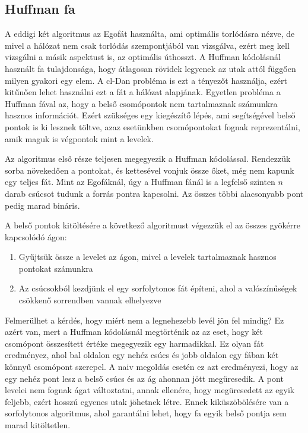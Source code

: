 \documentclass[12pt]{report}
\begin{document}
\subsection{Huffman fa}

A eddigi két algoritmus az Egofát\cite{avin_demand-aware_nodate} használta, ami optimális torlódásra nézve, de mivel a hálózat nem csak torlódás szempontjából van vizsgálva, ezért meg kell vizsgálni a másik aspektust is, az optimális úthosszt.
A Huffman kódolásnál\cite{huf52} használt fa tulajdonsága, hogy átlagosan rövidek legyenek az utak attól függően milyen gyakori egy elem.
A cl-Dan probléma is ezt a tényezőt használja, ezért kitűnően lehet használni ezt a fát a hálózat alapjának.
Egyetlen probléma a Huffman fával az, hogy a belső csomópontok nem tartalmaznak számunkra hasznos információt.
Ezért szükséges egy kiegészítő lépés, ami segítségével belső pontok is ki lesznek töltve, azaz esetünkben csomópontokat fognak reprezentálni, amik maguk is végpontok mint a levelek.

Az algoritmus első része teljesen megegyezik a Huffman kódolással.
Rendezzük sorba növekedően a pontokat, és kettesével vonjuk össze őket, még nem kapunk egy teljes fát.
Mint az Egofáknál, úgy a Huffman fánál is a legfelső szinten \(n\) darab csúcsot tudunk a forrás pontra kapcsolni.
Az összes többi alacsonyabb pont pedig marad bináris.

A belső pontok kitöltésére a következő algoritmust végezzük el az összes gyökérre kapcsolódó ágon:
\begin{enumerate}
	\item Gyűjtsük össze a levelet az ágon, mivel a levelek tartalmaznak hasznos pontokat számunkra
	\item Az csúcsokból kezdjünk el egy sorfolytonos fát építeni, ahol a valószínűségek csökkenő sorrendben vannak elhelyezve
\end{enumerate}
 
Felmerülhet a kérdés, hogy miért nem a legnehezebb levél jön fel mindig?
Ez azért van, mert a Huffman kódolásnál megtörténik az az eset, hogy két csomópont összesített értéke megegyezik egy harmadikkal.
Ez olyan fát eredményez, ahol bal oldalon egy nehéz csúcs és jobb oldalon egy fában két könnyű csomópont szerepel.
A naiv megoldás esetén ez azt eredményezi, hogy az egy nehéz pont lesz a belső csúcs és az ág ahonnan jött megüresedik.
A pont levelei nem fognak ágat változtatni, annak ellenére, hogy megüresedett az egyik feljebb, ezért hosszú egyenes utak jöhetnek létre.
Ennek kiküszöbölésére van a sorfolytonos algoritmus, ahol garantálni lehet, hogy fa egyik belső pontja sem marad kitöltetlen.
\end{document}
